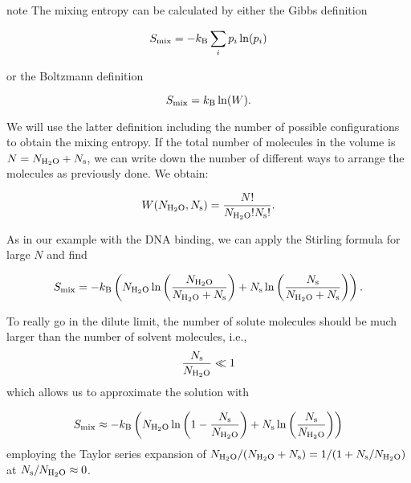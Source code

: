 \documentclass[letterpaper,10pt,english]{sphinxmanual}
\begin{document}
\begin{sphinxadmonition}{note}{}
\sphinxAtStartPar
The mixing entropy can be calculated by either the Gibbs definition

\sphinxAtStartPar
\begin{equation}
S_{\rm mix}=-k_{\rm B}\sum_{i}p_{i}\ln(p_{i})
\end{equation}

\sphinxAtStartPar
or the Boltzmann definition

\sphinxAtStartPar
\begin{equation}
S_{\rm mix}=k_{\rm B}\ln(W).
\end{equation}

\sphinxAtStartPar
We will use the latter definition including the number of possible configurations to obtain the mixing entropy. If the total number of molecules in the volume is \(N=N_{\rm H_2O}+N_{\rm s}\), we can write down the number of different ways to arrange the molecules as previously done. We obtain:

\sphinxAtStartPar
\begin{equation}
W(N_{\rm H_2O}, N_{\rm s} )=\frac{N!}{N_{\rm H_2O}! N_{\rm s}!}.
\end{equation}

\sphinxAtStartPar
As in our example with the DNA binding, we can apply the Stirling formula for large \(N\) and find

\sphinxAtStartPar
\begin{equation}
S_{\rm mix}=-k_\mathrm{B} \left ( N_{\rm H_2O} \ln\left (\frac{N_{\rm H_2O}}{N_{\rm H_2O}+N_{\rm s}}\right) +N_{\rm s}\ln\left (\frac{N_{\rm s}}{N_{\rm H_2O}+N_{\rm s}} \right )\right ).
\end{equation}

\sphinxAtStartPar
To really go in the dilute limit, the number of solute molecules should be much larger than the number of solvent molecules, i.e.,
\begin{equation*}
\begin{split}\frac{N_{\rm s}}{N_{\rm H_2O}}\ll 1\end{split}
\end{equation*}
\sphinxAtStartPar
which allows us to approximate the solution with

\sphinxAtStartPar
\begin{equation}
S_{\rm mix}\approx -k_\mathrm{B} \left ( N_{\rm H_2O} \ln \left ( 1-\frac{N_{\rm s}}{N_{\rm H_2O}}\right) +N_{\rm s}\ln\left ( \frac{N_{\rm s}}{N_{\rm H_2O}}\right)\right )
\end{equation} employing the Taylor series expansion of \(N_{\rm H_2O}/(N_{\rm H_2O}+N_{\rm s})=1/(1+N_{\rm s}/N_\mathrm{H_2O})\) at \(N_{\rm s}/N_\mathrm{H_2O}\approx 0\).


\end{sphinxadmonition}
\end{document}
